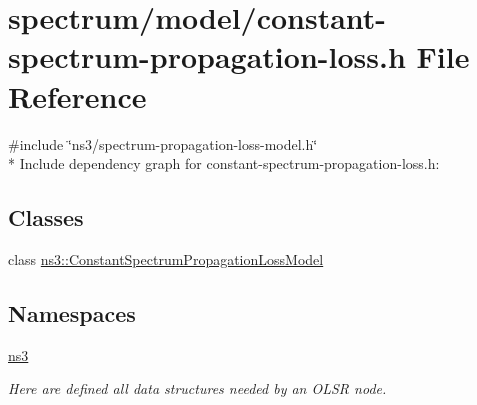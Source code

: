 \hypertarget{constant-spectrum-propagation-loss_8h}{}\section{spectrum/model/constant-\/spectrum-\/propagation-\/loss.h File Reference}
\label{constant-spectrum-propagation-loss_8h}
{\ttfamily \#include \char`\"{}ns3/spectrum-\/propagation-\/loss-\/model.\+h\char`\"{}}\\*
Include dependency graph for constant-\/spectrum-\/propagation-\/loss.h\+:
\subsection*{Classes}
\begin{DoxyCompactItemize}
\item 
class \hyperlink{classns3_1_1ConstantSpectrumPropagationLossModel}{ns3\+::\+Constant\+Spectrum\+Propagation\+Loss\+Model}
\end{DoxyCompactItemize}
\subsection*{Namespaces}
\begin{DoxyCompactItemize}
\item 
 \hyperlink{namespacens3}{ns3}
\begin{DoxyCompactList}\small\item\em Here are defined all data structures needed by an O\+L\+SR node. \end{DoxyCompactList}\end{DoxyCompactItemize}
